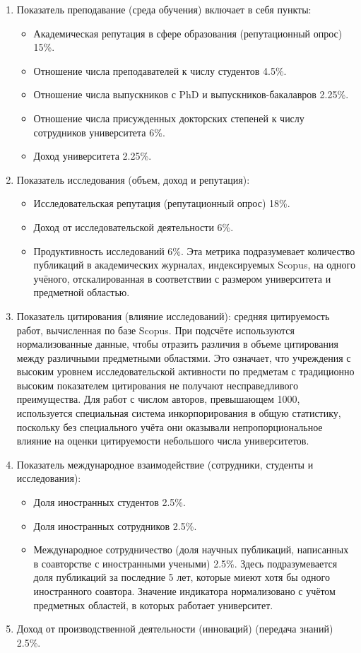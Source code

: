 \begin{enumerate}
  \item Показатель преподавание (среда обучения) включает в себя пункты:
  \begin{itemize}
    \item Академическая репутация в сфере образования (репутационный опрос) 15\%.
    \item Отношение числа преподавателей к числу студентов 4.5\%.
    \item Отношение числа выпускников с PhD и выпускников-бакалавров 2.25\%.
    \item Отношение числа присужденных докторских степеней к числу сотрудников университета 6\%.
    \item Доход университета 2.25\%.
  \end{itemize}
  \item Показатель исследования (объем, доход и репутация):
  \begin{itemize}
    \item Исследовательская репутация (репутационный опрос) 18\%.
    \item Доход от исследовательской деятельности 6\%.
    \item Продуктивность исследований 6\%. Эта метрика подразумевает количество публикаций
    в академических журналах, индексируемых Scopus, на одного учёного, отскалированная в
    соответствии с размером университета и предметной областью.
  \end{itemize}
  \item Показатель цитирования (влияние исследований):
    средняя цитируемость работ, вычисленная по базе Scopus. При подсчёте используются
    нормализованные данные, чтобы отразить различия в объеме цитирования между различными
    предметными областями. Это означает, что учреждения с высоким уровнем исследовательской
    активности по предметам с традиционно высоким показателем цитирования не получают несправедливого преимущества.
    Для работ с числом авторов, превышающем 1000, используется специальная система
    инкорпорирования в общую статистику, поскольку без специального учёта они оказывали непропорциональное
    влияние на оценки цитируемости небольшого числа университетов.
  \item Показатель международное взаимодействие (сотрудники, студенты и исследования):
  \begin{itemize}
    \item Доля иностранных студентов 2.5\%.
    \item Доля иностранных сотрудников 2.5\%.
    \item Международное сотрудничество (доля научных публикаций, написанных в
    соавторстве с иностранными учеными) 2.5\%. Здесь подразумевается доля
    публикаций за последние 5 лет, которые миеют хотя бы одного иностранного соавтора. Значение
    индикатора нормализовано с учётом предметных областей, в которых работает университет.
  \end{itemize}
  \item Доход от производственной деятельности (инноваций) (передача знаний) 2.5\%.
\end{enumerate}

